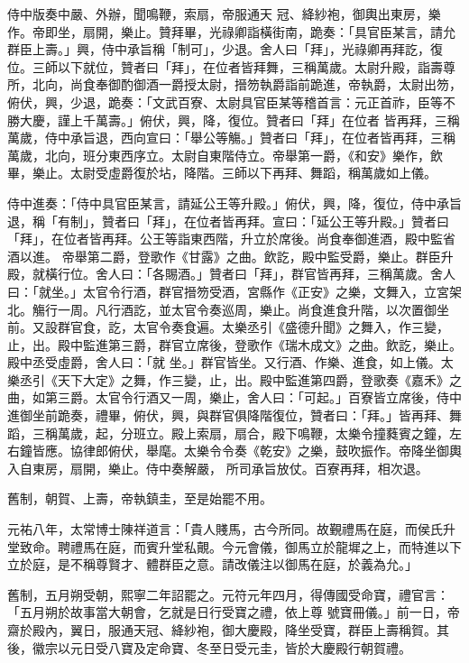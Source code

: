 \begin{pinyinscope}
 侍中版奏中嚴、外辦，聞鳴鞭，索扇，帝服通天
 冠、絳紗袍，御輿出東房，樂作。帝即坐，扇開，樂止。贊拜畢，光祿卿詣橫街南，跪奏：「具官臣某言，請允群臣上壽。」興，侍中承旨稱「制可」，少退。舍人曰「拜」，光祿卿再拜訖，復位。三師以下就位，贊者曰「拜」，在位者皆拜舞，三稱萬歲。太尉升殿，詣壽尊所，北向，尚食奉御酌御酒一爵授太尉，搢笏執爵詣前跪進，帝執爵，太尉出笏，俯伏，興，少退，跪奏：「文武百寮、太尉具官臣某等稽首言：元正首祚，臣等不勝大慶，謹上千萬壽。」俯伏，興，降，復位。贊者曰「拜」在位者
 皆再拜，三稱萬歲，侍中承旨退，西向宣曰：「舉公等觴。」贊者曰「拜」，在位者皆再拜，三稱萬歲，北向，班分東西序立。太尉自東階侍立。帝舉第一爵，《和安》樂作，飲畢，樂止。太尉受虛爵復於坫，降階。三師以下再拜、舞蹈，稱萬歲如上儀。



 侍中進奏：「侍中具官臣某言，請延公王等升殿。」俯伏，興，降，復位，侍中承旨退，稱「有制」，贊者曰「拜」，在位者皆再拜。宣曰：「延公王等升殿。」贊者曰「拜」，在位者皆再拜。公王等詣東西階，升立於席後。尚食奉御進酒，殿中監省酒以進。
 帝舉第二爵，登歌作《甘露》之曲。飲訖，殿中監受爵，樂止。群臣升殿，就橫行位。舍人曰：「各賜酒。」贊者曰「拜」，群官皆再拜，三稱萬歲。舍人曰：「就坐。」太官令行酒，群官搢笏受酒，宮縣作《正安》之樂，文舞入，立宮架北。觴行一周。凡行酒訖，並太官令奏巡周，樂止。尚食進食升階，以次置御坐前。又設群官食，訖，太官令奏食遍。太樂丞引《盛德升聞》之舞入，作三變，止，出。殿中監進第三爵，群官立席後，登歌作《瑞木成文》之曲。飲訖，樂止。殿中丞受虛爵，舍人曰：「就
 坐。」群官皆坐。又行酒、作樂、進食，如上儀。太樂丞引《天下大定》之舞，作三變，止，出。殿中監進第四爵，登歌奏《嘉禾》之曲，如第三爵。太官令行酒又一周，樂止，舍人曰：「可起。」百寮皆立席後，侍中進御坐前跪奏，禮畢，俯伏，興，與群官俱降階復位，贊者曰：「拜。」皆再拜、舞蹈，三稱萬歲，起，分班立。殿上索扇，扇合，殿下鳴鞭，太樂令撞蕤賓之鐘，左右鐘皆應。協律郎俯伏，舉麾。太樂令令奏《乾安》之樂，鼓吹振作。帝降坐御輿入自東房，扇開，樂止。侍中奏解嚴，
 所司承旨放仗。百寮再拜，相次退。



 舊制，朝賀、上壽，帝執鎮圭，至是始罷不用。



 元祐八年，太常博士陳祥道言：「貴人賤馬，古今所同。故覲禮馬在庭，而侯氏升堂致命。聘禮馬在庭，而賓升堂私覿。今元會儀，御馬立於龍墀之上，而特進以下立於庭，是不稱尊賢才、體群臣之意。請改儀注以御馬在庭，於義為允。」



 舊制，五月朔受朝，熙寧二年詔罷之。元符元年四月，得傳國受命寶，禮官言：「五月朔於故事當大朝會，乞就是日行受寶之禮，依上尊
 號寶冊儀。」前一日，帝齋於殿內，翼日，服通天冠、絳紗袍，御大慶殿，降坐受寶，群臣上壽稱賀。其後，徽宗以元日受八寶及定命寶、冬至日受元圭，皆於大慶殿行朝賀禮。




\end{pinyinscope}
